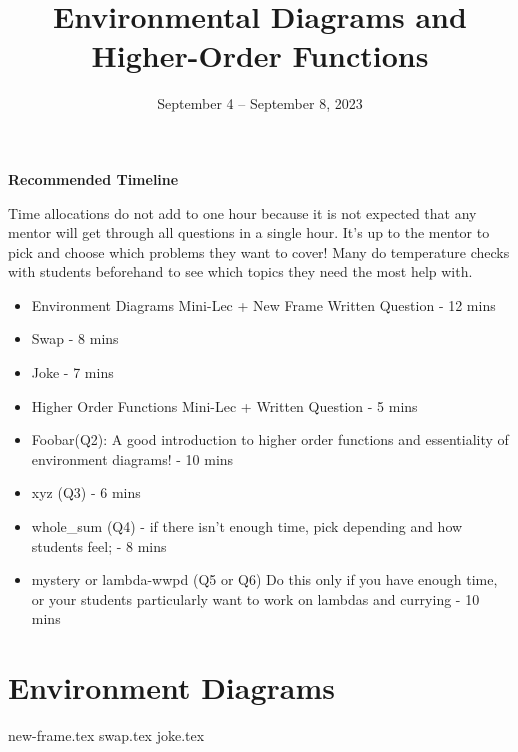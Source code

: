 \documentclass{exam}
\title{Environmental Diagrams \titlebreak and Higher-Order Functions}
\date{September 4 -- September 8, 2023}
\begin{document}
\maketitle

\begin{blocksection}
\begin{guide}
\textbf{Recommended Timeline}

Time allocations do not add to one hour because it is not expected that any mentor will get through all questions in a single hour. It's up to the mentor to pick and choose which problems they want to cover! Many do temperature checks with students beforehand to see which topics they need the most help with.

\begin{itemize}
    \item Environment Diagrams Mini-Lec + New Frame Written Question - 12 mins
    \item Swap - 8 mins
    \item Joke - 7 mins
    \item Higher Order Functions Mini-Lec + Written Question - 5 mins
    \item Foobar(Q2): A good introduction to higher order functions and essentiality of environment diagrams! - 10 mins
    \item xyz (Q3) - 6 mins
    \item whole\_sum (Q4) - if there isn't enough time, pick depending and how students feel; - 8 mins
    \item mystery or lambda-wwpd (Q5 or Q6) Do this only if you have enough time, or your students particularly want to work on lambdas and currying - 10 mins
\end{itemize}
\end{guide}
\end{blocksection}


\section{Environment Diagrams}

\begin{questions}
{new-frame.tex}
{swap.tex}
{joke.tex}
\end{questions}
\end{document}
